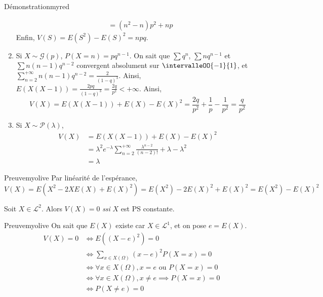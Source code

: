 \begin{demo}{Démonstration}{myred}
\begin{enumerate}
\begin{align*}
                &= (n^2 - n) p^2 + np
            \end{align*}
            Enfin, $V(S) = E(S^2) - E(S)^2 = npq$.
            \item Si $X \sim \mathcal{G}(p)$, $P(X = n) = pq^{n-1}$. On sait que $\sum q^n$, $\sum n q^{n-1}$ et $\sum n (n-1) q^{n-2}$ convergent absolument sur $\intervalleOO{-1}{1}$, et $\sum_{n=2}^{+\infty} n(n-1)q^{n-2} = \frac{2}{(1 - q)^3}$. Ainsi, $E(X(X-1)) = \frac{2pq}{(1-q)^3} = \frac{2q}{p^2} < +\infty$. Ainsi, 
            \[ V(X) = E(X(X-1)) + E(X) - E(X)^2 = \frac{2q}{p^2} + \frac{1}{p} - \frac{1}{p^2} = \frac{q}{p^2} \] 
            \item Si $X \sim \mathcal{P}(\lambda)$, 
            \begin{align*}
                V(X) 
                &= E(X(X-1)) + E(X) - E(X)^2 \\
                &= \lambda^2 e^{-\lambda} \sum_{n=2}^{+\infty} \frac{\lambda^{n-2}}{(n-2)!} + \lambda - \lambda^2\\
                &= \lambda            
            \end{align*}
        \end{enumerate}
    \end{demo}

    \begin{demo}{Preuve}{myolive}
        Par linéarité de l’espérance,
        \[ V(X) = E(X^2 - 2 X E(X) + E(X)^2) = E(X^2) - 2 E(X)^2 + E(X)^2 = E(X^2) - E(X)^2 \]
    \end{demo}

    \begin{prop}{}{}
        Soit $X \in \mathcal{L}^2$. Alors $V(X) = 0$ \textit{ssi} $X$ est PS constante.
    \end{prop}

    \begin{demo}{Preuve}{myolive}
        On sait que $E(X)$ existe car $X \in \mathcal{L}^1$, et on pose $e = E(X)$. 
        \begin{align*}
            V(X) = 0
            &\iff E((X - e)^2) = 0 \\
            &\iff \sum_{x \in X(\Omega)} (x - e)^2 P(X = x) = 0 \\
            &\iff \forall x \in X(\Omega), x = e \text{ ou } P(X = x) = 0 \\
            &\iff \forall x \in X(\Omega), x \neq e \implies P(X = x) = 0 \\
            &\iff P(X \neq e) = 0
        \end{align*}
    \end{demo}

